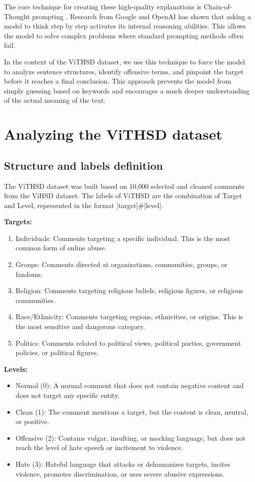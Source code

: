 \documentclass[11pt]{article}
\begin{document}
The core technique for creating these high-quality explanations is Chain-of-Thought
prompting \citep{Wei2022ChainOfThought}. Research from Google and OpenAI has shown that asking a model to think step by
step activates its internal reasoning abilities. This allows the model to solve complex problems
where standard prompting methods often fail.

In the context of the ViTHSD dataset, we use this technique to force the model to analyze
sentence structures, identify offensive terms, and pinpoint the target before it reaches a final
conclusion. This approach prevents the model from simply guessing based on keywords and
encourages a much deeper understanding of the actual meaning of the text.

\section{Analyzing the ViTHSD dataset}

\subsection{Structure and labels definition}
The ViTHSD dataset was built based on 10,000 selected and cleaned comments from the
ViHSD dataset. The labels of ViTHSD are the combination of Target and Level, represented in
the format [target]\#[level].

\textbf{Targets:}
\begin{enumerate}[leftmargin=*]
\item Individuals: Comments targeting a specific individual. This is the most common form of
online abuse.
\item Groups: Comments directed at organizations, communities, groups, or fandoms.
\item Religion: Comments targeting religious beliefs, religious figures, or religious
communities.
\item Race/Ethnicity: Comments targeting regions, ethnicities, or origins. This is the most
sensitive and dangerous category.
\item Politics: Comments related to political views, political parties, government policies, or
political figures.
\end{enumerate}

\textbf{Levels:}
\begin{itemize}[leftmargin=*]
\item Normal (0): A normal comment that does not contain negative content and does not
target any specific entity.
\item Clean (1): The comment mentions a target, but the content is clean, neutral, or positive.
\item Offensive (2): Contains vulgar, insulting, or mocking language, but does not reach the
level of hate speech or incitement to violence.
\item Hate (3): Hateful language that attacks or dehumanizes targets, incites violence,
promotes discrimination, or uses severe abusive expressions.
\end{itemize}
\end{document}

